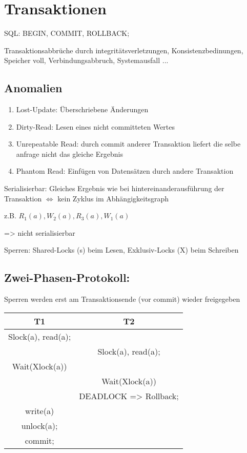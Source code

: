 \section*{Transaktionen}
SQL: BEGIN, COMMIT, ROLLBACK;

Transaktionsabbrüche durch integritätsverletzungen, Konsistenzbedinungen, Speicher voll, Verbindungsabbruch, Systemausfall ...

\subsection*{Anomalien}
\begin{enumerate}
\item Lost-Update: Überschriebene Änderungen
\item Dirty-Read: Lesen eines nicht committeten Wertes
\item Unrepeatable Read: durch commit anderer Transaktion liefert die selbe anfrage nicht das gleiche Ergebnis
\item Phantom Read: Einfügen von Datensätzen durch andere Transaktion
\end{enumerate}

Serialisierbar: Gleiches Ergebnis wie bei hintereinanderausführung der Transaktion
$\Leftrightarrow$ kein Zyklus im Abhängigkeitsgraph

z.B. $R_1(a), W_2(a), R_3(a), W_1(a)$
 => nicht serialisierbar

Sperren: Shared-Locks (s) beim Lesen, Exklusiv-Locks (X) beim Schreiben

\subsection*{Zwei-Phasen-Protokoll:} Sperren werden erst am Transaktionsende (vor commit) wieder freigegeben

\begin{tabular}{|c|c|}
\hline
T1 & T2 \\
\hline
Slock(a), read(a); & \\
& Slock(a), read(a);\\
Wait(Xlock(a)) & \\
& Wait(Xlock(a))\\
& DEADLOCK => Rollback;\\
write(a)&\\
unlock(a);&\\
commit;&\\
\hline
\end{tabular}




